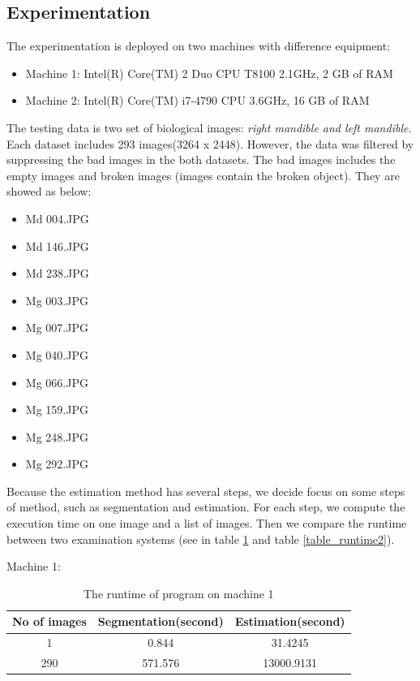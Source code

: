 \subsection{Experimentation}
The experimentation is deployed on two machines with difference equipment:
\begin{itemize}
\item Machine 1: Intel(R) Core(TM) 2 Duo CPU T8100 2.1GHz, 2 GB of RAM
\item Machine 2: Intel(R) Core(TM) i7-4790 CPU 3.6GHz, 16 GB of RAM
\end{itemize}
The testing data is two set of biological images: \textit{right mandible and left mandible}. Each dataset includes 293 images(3264 x 2448). However, the data was filtered by suppressing the bad images in the both datasets. The bad images includes the empty images and broken images (images contain the broken object). They are showed as below:
\begin{multicols}{3}
\begin{itemize}
\item Md 004.JPG
\item Md 146.JPG
\item Md 238.JPG
\item Mg 003.JPG
\item Mg 007.JPG
\item Mg 040.JPG
\item Mg 066.JPG
\item Mg 159.JPG
\item Mg 248.JPG
\item Mg 292.JPG
\end{itemize} 
\end{multicols}
Because the estimation method has several steps, we decide focus on some steps of method, such as segmentation and estimation. For each step, we compute the execution time on one image and a list of images. Then we compare the runtime between two examination systems (see in table \ref{table_runtime1} and table \ref{table_runtime2}).

Machine 1:
\begin{table}[h]
	\centering
	\begin{tabular}{|c|c|c|}
		\hline
		No of images & Segmentation(second) & Estimation(second) \\ \hline
		1 & 0.844 & 31.4245   \\ \hline
		290 & 571.576 & 13000.9131   \\ \hline
	\end{tabular}	
	\caption{The runtime of program on machine 1}		
	\label{table_runtime1}
\end{table}

